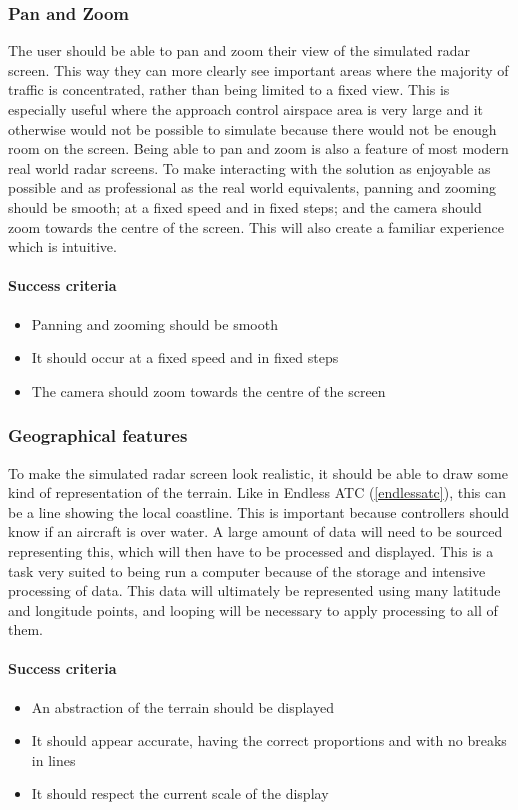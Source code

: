 \documentclass{article}
\begin{document}
\subsubsection{Pan and Zoom}
The user should be able to pan and zoom their view of the simulated radar screen.
This way they can more clearly see important areas where the majority of traffic is concentrated, rather than being limited to a fixed view.
This is especially useful where the approach control airspace area is very large and it otherwise would not be possible to simulate because there would not be enough room on the screen.
Being able to pan and zoom is also a feature of most modern real world radar screens.
To make interacting with the solution as enjoyable as possible and as professional as the real world equivalents, panning and zooming should be smooth; at a fixed speed and in fixed steps; and the camera should zoom towards the centre of the screen.
This will also create a familiar experience which is intuitive.

\paragraph{Success criteria}
\begin{itemize}
    \item Panning and zooming should be smooth
    \item It should occur at a fixed speed and in fixed steps
    \item The camera should zoom towards the centre of the screen
\end{itemize}

\subsubsection{Geographical features}
To make the simulated radar screen look realistic, it should be able to draw some kind of representation of the terrain.
Like in Endless ATC (\ref{endlessatc}), this can be a line showing the local coastline.
This is important because controllers should know if an aircraft is over water.
A large amount of data will need to be sourced representing this, which will then have to be processed and displayed.
This is a task very suited to being run a computer because of the storage and intensive processing of data.
This data will ultimately be represented using many latitude and longitude points, and looping will be necessary to apply processing to all of them.

\paragraph{Success criteria}
\begin{itemize}
    \item An abstraction of the terrain should be displayed
    \item It should appear accurate, having the correct proportions and with no breaks in lines
    \item It should respect the current scale of the display
\end{itemize}
\end{document}
